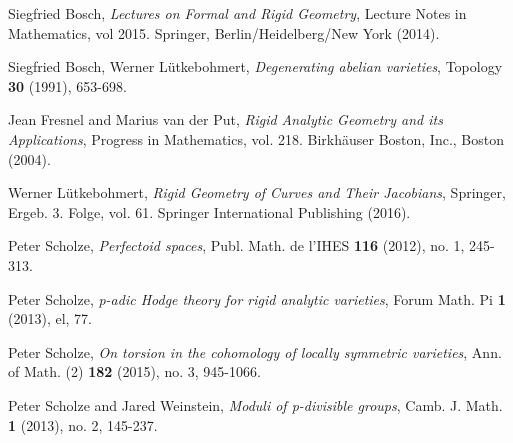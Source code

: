 \documentclass[10pt,oneside]{amsart}
\theoremstyle{definition}
\begin{document}
\begin{thebibliography}{99}
	
	Siegfried Bosch,
	\textit{Lectures on Formal and Rigid Geometry}, Lecture Notes in Mathematics, vol 2015. Springer, Berlin/Heidelberg/New York (2014).
	
	Siegfried Bosch, Werner L\"utkebohmert,
	\textit{Degenerating abelian varieties}, Topology {\bf 30} (1991), 653-698.
	
	Jean Fresnel and Marius van der Put,
	\textit{Rigid Analytic Geometry and its Applications}, Progress in Mathematics, vol. 218. Birkh\"auser Boston, Inc., Boston (2004).
	
	Werner L\"utkebohmert,
	\textit{Rigid Geometry of Curves and Their Jacobians}, Springer, Ergeb. 3. Folge, vol. 61. Springer International Publishing (2016). 
	
	Peter Scholze,
	\textit{Perfectoid spaces}, Publ. Math. de l'IHES {\bf 116} (2012), no. 1, 245-313.
	
	Peter Scholze,
	\textit{p-adic Hodge theory for rigid analytic varieties}, Forum Math. Pi {\bf 1} (2013), el, 77.
	
	Peter Scholze,
	\textit{On torsion in the cohomology of locally symmetric varieties}, Ann. of Math. (2) {\bf 182} (2015), no. 3, 945-1066.
	
	Peter Scholze and Jared Weinstein,
	\textit{Moduli of p-divisible groups}, Camb. J. Math. {\bf 1} (2013), no. 2, 145-237.
	
\end{thebibliography}

	
	
	
\end{document}

